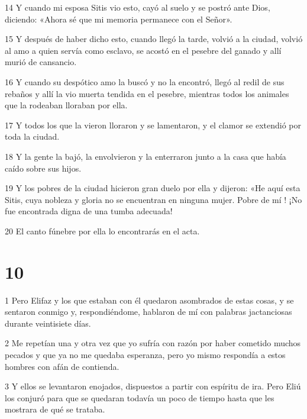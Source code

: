 \par 14 Y cuando mi esposa Sitis vio esto, cayó al suelo y se postró ante Dios, diciendo: «Ahora sé que mi memoria permanece con el Señor».

\par 15 Y después de haber dicho esto, cuando llegó la tarde, volvió a la ciudad, volvió al amo a quien servía como esclavo, se acostó en el pesebre del ganado y allí murió de cansancio.

\par 16 Y cuando su despótico amo la buscó y no la encontró, llegó al redil de sus rebaños y allí la vio muerta tendida en el pesebre, mientras todos los animales que la rodeaban lloraban por ella.

\par 17 Y todos los que la vieron lloraron y se lamentaron, y el clamor se extendió por toda la ciudad.

\par 18 Y la gente la bajó, la envolvieron y la enterraron junto a la casa que había caído sobre sus hijos.

\par 19 Y los pobres de la ciudad hicieron gran duelo por ella y dijeron: «He aquí esta Sitis, cuya nobleza y gloria no se encuentran en ninguna mujer. Pobre de mí ! ¡No fue encontrada digna de una tumba adecuada!

\par 20 El canto fúnebre por ella lo encontrarás en el acta.

\chapter{10}

\par 1 Pero Elifaz y los que estaban con él quedaron asombrados de estas cosas, y se sentaron conmigo y, respondiéndome, hablaron de mí con palabras jactanciosas durante veintisiete días.

\par 2 Me repetían una y otra vez que yo sufría con razón por haber cometido muchos pecados y que ya no me quedaba esperanza, pero yo mismo respondía a estos hombres con afán de contienda.

\par 3 Y ellos se levantaron enojados, dispuestos a partir con espíritu de ira. Pero Eliú los conjuró para que se quedaran todavía un poco de tiempo hasta que les mostrara de qué se trataba.

